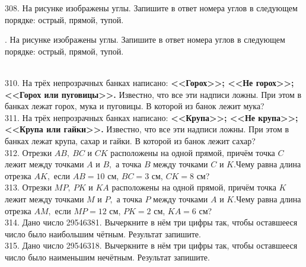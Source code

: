 \documentclass[12pt]{article}
\begin{document}
308. На рисунке изображены углы. Запишите в ответ номера углов в следующем порядке: острый, прямой, тупой.\\
\begin{figure}[ht!]
\end{figure}\newpage{}. На рисунке изображены углы. Запишите в ответ номера углов в следующем порядке: острый, прямой, тупой.\\
\begin{figure}[ht!]
\end{figure}\\
310. На трёх непрозрачных банках написано: {\bf <<Горох>>; <<Не горох>>; <<Горох или пуговицы>>.} Известно, что все эти надписи ложны. При этом в банках лежат горох, мука и пуговицы. В которой из банок лежит мука?\\
311. На трёх непрозрачных банках написано: {\bf <<Крупа>>; <<Не крупа>>; <<Крупа или гайки>>.} Известно, что все эти надписи ложны. При этом в банках лежат крупа, сахар и гайки. В которой из банок лежит сахар?\\
312. Отрезки $AB,\ BC$ и $CK$ расположены на одной прямой, причём точка $C$ лежит между точками $A$ и $B,$ а точка $B$ между точками $C$ и $K.$Чему равна длина отрезка $AK,$ если $AB=10$ см, $BC=3$ см, $CK=8$ см?\\
313. Отрезки $MP,\ PK$ и $KA$ расположены на одной прямой, причём точка $K$ лежит между точками $M$ и $P,$ а точка $P$ между точками $A$ и $K.$Чему равна длина отрезка $AM,$ если $MP=12$ см, $PK=2$ см, $KA=6$ см?\\
314. Дано число 29546381. Вычеркните в нём три цифры так, чтобы оставшееся число было наибольшим чётным. Результат запишите.\\
315. Дано число 29546318. Вычеркните в нём три цифры так, чтобы оставшееся число было наименьшим нечётным. Результат запишите.\\
\end{document}
